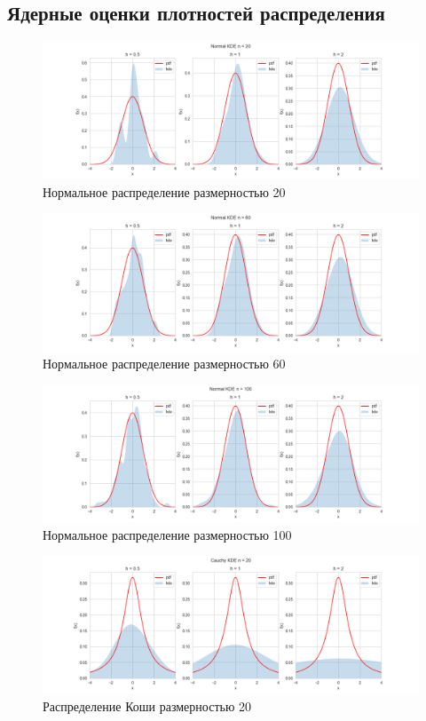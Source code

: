 \documentclass[12pt,a4paper]{article}
\begin{document}
\subsection{Ядерные оценки плотностей распределения}
\begin{figure}[H]
    \centering
    \includegraphics[scale=0.5]{images/Normal20.png}
    \caption{Нормальное распределение размерностью 20}
\end{figure}

\begin{figure}[H]
    \centering
    \includegraphics[scale=0.5]{images/Normal60.png}
    \caption{Нормальное распределение размерностью 60}
\end{figure}

\begin{figure}[H]
    \centering
    \includegraphics[scale=0.5]{images/Normal100.png}
    \caption{Нормальное распределение размерностью 100}
\end{figure}

\begin{figure}[H]
    \centering
    \includegraphics[scale=0.5]{images/Cauchy20.png}
    \caption{Распределение Коши размерностью 20}
\end{figure}
\end{document}
